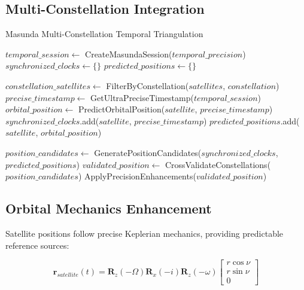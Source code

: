 \documentclass[12pt,a4paper]{article}
\begin{document}
\subsection{Multi-Constellation Integration}

\begin{algorithm}
\caption{Masunda Multi-Constellation Temporal Triangulation}
\begin{algorithmic}[1]
    \State $temporal\_session \gets$ CreateMasundaSession($temporal\_precision$)
    \State $synchronized\_clocks \gets \{\}$
    \State $predicted\_positions \gets \{\}$
    
        \State $constellation\_satellites \gets$ FilterByConstellation($satellites$, $constellation$)
            \State $precise\_timestamp \gets$ GetUltraPreciseTimestamp($temporal\_session$)
            \State $orbital\_position \gets$ PredictOrbitalPosition($satellite$, $precise\_timestamp$)
            \State $synchronized\_clocks$.add($satellite$, $precise\_timestamp$)
            \State $predicted\_positions$.add($satellite$, $orbital\_position$)
        \EndFor
    \EndFor
    
    \State $position\_candidates \gets$ GeneratePositionCandidates($synchronized\_clocks$, $predicted\_positions$)
    \State $validated\_position \gets$ CrossValidateConstellations($position\_candidates$)
    \State \Return ApplyPrecisionEnhancements($validated\_position$)
\EndProcedure
\end{algorithmic}
\end{algorithm}

\subsection{Orbital Mechanics Enhancement}

Satellite positions follow precise Keplerian mechanics, providing predictable reference sources:

\begin{equation}
\mathbf{r}_{satellite}(t) = \mathbf{R}_z(-\Omega) \mathbf{R}_x(-i) \mathbf{R}_z(-\omega) \begin{bmatrix} r\cos\nu \\ r\sin\nu \\ 0 \end{bmatrix}
\end{equation}
\end{document}

